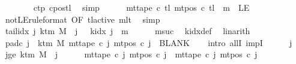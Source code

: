 \begin{isabellebody}
\ \ \ \ \ \ \isamarkupfalse%
\ c{}{\isacharunderscore}{\kern0pt}tp\ c{}{\isacharunderscore}{\kern0pt}pos{\isacharunderscore}{\kern0pt}tl\ \isamarkupfalse%
\ simp\isanewline
\ \ \ \ \isamarkupfalse%
\ {\isachardoublequoteopen}mt{\isacharunderscore}{\kern0pt}tape\ c{}\ {\isacharquery}{\kern0pt}tl\ {\isacharparenleft}{\kern0pt}mt{\isacharunderscore}{\kern0pt}pos\ c{}\ {\isacharquery}{\kern0pt}tl\ {\isacharminus}{\kern0pt}\ m{\isacharparenright}{\kern0pt}\ {\isasymnoteq}\ LE{}{\isachardoublequoteclose}\isanewline
\ \ \ \ \ \ \isamarkupfalse%
\ notLE{\isacharbrackleft}{\kern0pt}rule{\isacharunderscore}{\kern0pt}format{\isacharcomma}{\kern0pt}\ OF\ tl{\isacharunderscore}{\kern0pt}active\ mlt{\isacharbrackright}{\kern0pt}\ \isamarkupfalse%
\ simp\isanewline
\ \ \isamarkupfalse%
\isanewline
\ \ \isamarkupfalse%
\ tail{\isacharunderscore}{\kern0pt}idx{\isacharcolon}{\kern0pt}\ {\isachardoublequoteopen}{\isasymAnd}j{\isachardot}{\kern0pt}\ k{\isacharunderscore}{\kern0pt}tm\ M\ {\isasymle}\ j\ {\isasymLongrightarrow}\ {\isasymnot}\ k{\isacharunderscore}{\kern0pt}idx\ j\ {\isacharless}{\kern0pt}\ {\isacharquery}{\kern0pt}m{}{\isachardoublequoteclose}\isanewline
\ \ \ \ \isamarkupfalse%
\ m{}suc\ \isamarkupfalse%
\ k{\isacharunderscore}{\kern0pt}idx{\isacharunderscore}{\kern0pt}def\ \isamarkupfalse%
\ linarith\isanewline
\ \ \isamarkupfalse%
\ pad{\isacharunderscore}{\kern0pt}c{}{\isacharcolon}{\kern0pt}\ {\isachardoublequoteopen}{\isasymforall}j\ {\isasymge}\ k{\isacharunderscore}{\kern0pt}tm\ M{\isachardot}{\kern0pt}\ mt{\isacharunderscore}{\kern0pt}tape\ c{}\ j\ {\isacharparenleft}{\kern0pt}mt{\isacharunderscore}{\kern0pt}pos\ c{}\ j{\isacharparenright}{\kern0pt}\ {\isacharequal}{\kern0pt}\ BLANK{}{\isachardoublequoteclose}\isanewline
\ \ \isamarkupfalse%
\ {\isacharparenleft}{\kern0pt}intro\ allI\ impI{\isacharparenright}{\kern0pt}\isanewline
\ \ \ \ \isamarkupfalse%
\ j\ \isamarkupfalse%
\ jge{\isacharcolon}{\kern0pt}\ {\isachardoublequoteopen}k{\isacharunderscore}{\kern0pt}tm\ M\ {\isasymle}\ j{\isachardoublequoteclose}\isanewline
\ \ \ \ \isamarkupfalse%
\ {\isachardoublequoteopen}mt{\isacharunderscore}{\kern0pt}tape\ c{}\ j\ {\isacharparenleft}{\kern0pt}mt{\isacharunderscore}{\kern0pt}pos\ c{}\ j{\isacharparenright}{\kern0pt}\ {\isacharequal}{\kern0pt}\ mt{\isacharunderscore}{\kern0pt}tape\ c{}\ j\ {\isacharparenleft}{\kern0pt}mt{\isacharunderscore}{\kern0pt}pos\ c{}\ j{\isacharparenright}{\kern0pt}{\isachardoublequoteclose}\isanewline

\end{isabellebody}
